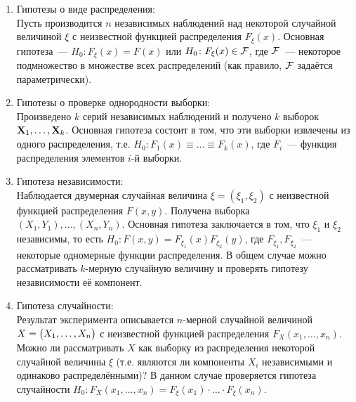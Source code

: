 \begin{enumerate}
    \item 
        Гипотезы о виде распределения: \\
        Пусть производится $n$ независимых наблюдений над некоторой случайной величиной $\xi$ с неизвестной функцией распределения $F_{\xi}(x)$.
        Основная гипотеза~--- $H_0 \colon F_{\xi}(x) = F(x)$ или $H_0 \colon F_{\xi}(x) \in \mathcal{F}$, где $\mathcal{F}$~--- 
        некоторое подмножество в множестве всех распределений (как правило, $\mathcal{F}$ задаётся параметрически).
    \item 
        Гипотезы о проверке однородности выборки: \\
        Произведено $k$ серий независимых наблюдений и получено $k$ выборок $\mathbf{X}_1, \ldots, \mathbf{X}_k$.
        Основная гипотеза состоит в том, что эти выборки извлечены из одного распределения, т.е.
        $H_0 \colon F_1(x) \equiv \ldots \equiv F_k(x)$, где $F_i$~--- функция распределения элементов $i$-й выборки.
    \item 
        Гипотеза независимости: \\
        Наблюдается двумерная случайная величина $\xi = (\xi_1, \xi_2)$ с неизвестной функцией распределения $F(x, y)$.
        Получена выборка $(X_1, Y_1), \ldots, (X_n, Y_n)$.
        Основная гипотеза заключается в том, что $\xi_1$ и $\xi_2$ независимы, 
        то есть $H_0\colon F(x, y) = F_{\xi_1}(x) F_{\xi_2}(y)$, где $F_{\xi_1}, F_{\xi_2}$~--- некоторые одномерные функции распределения.
        В общем случае можно рассматривать $k$-мерную случайную величину и проверять гипотезу независимости её компонент.
        
    \item 
        Гипотеза случайности: \\
        Результат эксперимента описывается $n$-мерной случайной величиной $X = \bigl(X_1, \ldots, X_n \bigr)$ с неизвестной функцией распределения $F_{X}(x_1, \ldots, x_n)$.
        Можно ли рассматривать $X$ как выборку из распределения некоторой случайной величины $\xi$ (т.е. являются ли компоненты $X_i$ независимыми и одинаково распределёнными)?
        В данном случае проверяется гипотеза случайности $H_0\colon F_{X}(x_1, \ldots, x_n) = F_{\xi}(x_1) \cdot \ldots \cdot F_{\xi}(x_n)$.

\end{enumerate}

